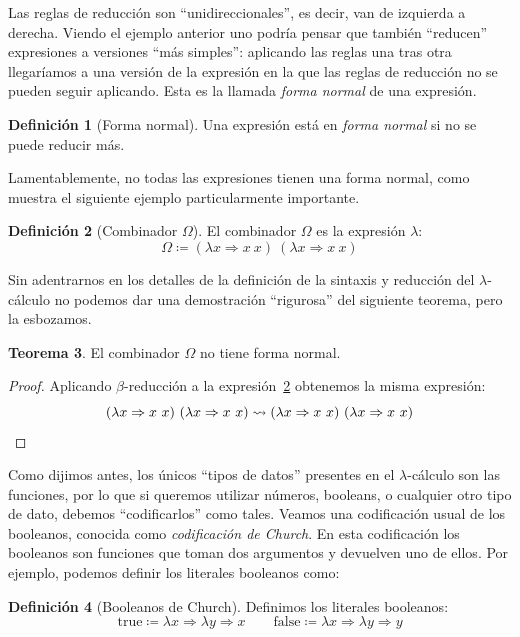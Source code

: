 \documentclass[
  a4paper, 
  10pt, 
  parskip=half, 
  toc=bibliography,
]{scrbook}
\theoremstyle{definition}
\theoremstyle{bolddef}
\newtheorem{theorem}{Teorema}[section]
\newtheorem{definition}[theorem]{Definición}
\renewcommand{\mapsto}{\Rightarrow}
\newcommand{\LeanTrue}{\text{true}}
\newcommand{\LeanFalse}{\text{false}}
\begin{document}
Las reglas de reducción son \enquote{unidireccionales}, es decir, van de izquierda a
derecha. Viendo el ejemplo anterior uno podría pensar que también \enquote{reducen}
expresiones a versiones \enquote{más simples}: aplicando las reglas una tras otra
llegaríamos a una versión de la expresión en la que las reglas de reducción no
se pueden seguir aplicando. Esta es la llamada \emph{forma normal} de una expresión.

\begin{definition}[Forma normal]
  Una expresión está en \emph{forma normal} si no se puede reducir más.
\end{definition}

Lamentablemente, no todas las expresiones tienen una forma normal, como muestra el
siguiente ejemplo particularmente importante.

\begin{definition}[Combinador \(\Omega\)]\label{def:omega_combinator}
  El combinador \(\Omega\) es la expresión \(\lambda\):
  \[
  \Omega \coloneqq (\lambda x \mapsto x \ x) \ (\lambda x \mapsto x \ x) 
  \]
\end{definition}

Sin adentrarnos en los detalles de la definición de la sintaxis y reducción del
\(\lambda\)-cálculo no podemos dar una demostración \enquote{rigurosa} del siguiente
teorema, pero la esbozamos.

\begin{theorem}
  El combinador \(\Omega\) no tiene forma normal.
\end{theorem}

\begin{proof}
  Aplicando \(\beta\)-reducción a la expresión~\ref{def:omega_combinator} obtenemos la
  misma expresión:
  \[
  (\lambda x \mapsto x \ x) \ (\lambda x \mapsto x \ x) \rightsquigarrow
  (\lambda x \mapsto x \ x) \ (\lambda x \mapsto x \ x) \qedhere
  \]
\end{proof}

Como dijimos antes, los únicos \enquote{tipos de datos} presentes en el
\(\lambda\)-cálculo son las funciones, por lo que si queremos utilizar números,
booleans, o cualquier otro tipo de dato, debemos \enquote{codificarlos} como
tales. Veamos una codificación usual de los booleanos, conocida como \emph{codificación de Church}.
En esta codificación los booleanos son funciones que toman dos argumentos y
devuelven uno de ellos. Por ejemplo, podemos definir los literales booleanos como:

\begin{definition}[Booleanos de Church]
  Definimos los literales booleanos:
  \[
    \LeanTrue \coloneqq \lambda x \mapsto \lambda y \mapsto x \qquad
    \LeanFalse \coloneqq \lambda x \mapsto \lambda y \mapsto y 
  \]
\end{definition}
\end{document}
